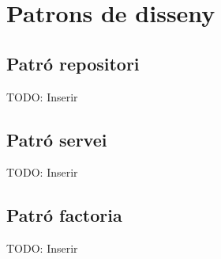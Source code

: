
\chapter{Patrons de disseny} %

\label{AppendixA} %

\section{Patró repositori}

TODO: Inserir

\section{Patró servei}

TODO: Inserir

\section{Patró factoria}

TODO: Inserir